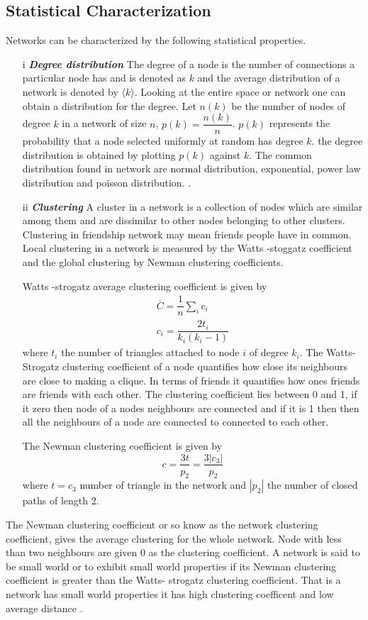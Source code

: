  \subsection{Statistical Characterization}
 
 Networks can be characterized by the following statistical properties.
 \begin{itemize}
 \item[i] \textit{\textbf{Degree distribution}}
 The degree of a node is the number of connections a particular node has  and is denoted as $k$  and the average distribution of a network is denoted by $\langle k \rangle$. Looking at the entire space or network one can obtain a distribution for the degree. Let $n(k)$ be the number of nodes of degree $k$  in a network of size $n$, $p(k) = \dfrac{n(k)}{n}$. $p(k)$ represents the probability that a node selected uniformly at random  has degree $k$. the degree distribution is obtained by plotting $p(k)$ against $k$\citep{estrada2015first}. The common distribution found in network are normal distribution, exponential, power law distribution and poisson distribution.
   \citep{chung2002average}.
   
 \item[ii] \textit{\textbf{Clustering }}
 A cluster in a network  is a collection of nodes which are similar among them and are dissimilar to other nodes belonging to other clusters. Clustering in friendship network may mean friends people have in common. Local clustering in a network is measured by   the Watts -stoggatz  coefficient and the global clustering by  Newman clustering coefficients.
 
 Watts -strogatz average clustering coefficient is given by 
 \begin{align}
 \overline{C} = \dfrac{1}{n} \sum_i c_i
  \\ c_i = \dfrac{2t_i}{k_i(k_i-1)} \nonumber
  \end{align}
   where $t_i $ the  number of triangles attached to node $i$ of degree $k_i$. The Watts-Strogatz clustering coefficient of a node quantifies how close its neighbours are close to making a clique. In terms of friends it quantifies how ones friends are friends with each other. The clustering coefficient  lies between 0 and 1, if it zero then node of a nodes neighbours are connected and  if it is 1 then then all the neighbours of a node are connected to connected to each other.
 
 The Newman clustering coefficient is given by
 \begin{equation}
 c = \frac{3t}{p_2} =\dfrac{3|c_3|}{p_2}
 \end{equation}
 where $t = c_3$ number of triangle in the network and $|p_2|$ the number of closed paths of length 2. 
 \end{itemize}
 The Newman clustering coefficient or so know as the network clustering coefficient, gives the average clustering for the whole network. Node with less than two neighbours are given 0 as the clustering coefficient.
 A network is said to be small world or to exhibit small world properties if its Newman clustering coefficient is greater than the Watts- strogatz clustering coefficient. That is a network has small world properties it has high clustering coefficent and low average distance \citep{estrada2012structure}.
